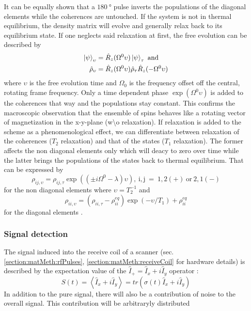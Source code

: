             It can be equally shown that a $\SI{180}{\degree}$ pulse inverts the populations of the diagonal elements while the coherences are untouched.  If the system is not in thermal equilibrium, the density matrix will evolve and generally relax back to its equilibrium state. If one neglects said relaxation at first, the free evolution can be described by 
            \begin{equation}
                \begin{split}
                    \ket\psi_\upsilon &= \hat R_z(\Omega^0\upsilon)\ket\psi_\tau ~ \mathrm{and} \\
                    \hat\rho_\upsilon &= \hat R_z(\Omega^0\upsilon)\hat\rho_\tau\hat R_z(-\Omega^0\upsilon)
                \end{split}
            \end{equation}
            where $\upsilon$ is the free evolution time and $\Omega_0$ is the frequency offset off the central, rotating frame frequency. Only a time dependent phase $\exp{(\Omega^0 \upsilon)}$ is added to the coherences that way and the populations stay constant. This confirms the macroscopic observation that the ensemble of spins behaves like a rotating vector of magnetization in the x-y-plane (w\textbackslash o relaxation). If relaxation is added to the scheme as a phenomenological effect, we can differentiate between relaxation of the coherences ($T_2$ relaxation) and that of the states ($T_1$ relaxation). The former affects the non diagonal elements only which will deacy to zero over time while the latter brings the populations of the states back to thermal equilibrium. That can be expressed by
            \begin{equation}
                \rho_{ij, \upsilon} = \rho_{ij, \tau} \exp{((\pm i\Omega^0-\lambda)\upsilon)},~\mathrm{i,j~=~ 1,2(+)~or~2,1(-)}
            \end{equation}
            for the non diagonal elements where $\upsilon = T_2^{-1}$ and
            \begin{equation}
                \rho_{ii,\upsilon} = (\rho_{ii,\tau} - \rho_{ii}^{eq})\exp(-\upsilon/T_1)+\rho_{ii}^{eq}
            \end{equation}
            for the diagonal elements \cite{levitt_spin_nodate}.
        \subsubsection{Signal detection}
        The signal induced into the receive coil of a scanner (sec. \ref{section:matMeth:rfPulses}, \ref{section:matMeth:receiveCoil} for hardware details) is described by the expectation value of the $\hat{I}_+ = \hat{I}_x + i\hat{I}_y$ operator \cite{levitt_spin_nodate}:
        \begin{equation}
            S(t) = \left< \hat{I}_x + i\hat{I}_y \right> = tr\left(\sigma(t)\hat{I}_x + i\hat{I}_y\right)
        \end{equation}
        In addition to the pure signal, there will also be a contribution of noise to the overall signal. This contribution will be arbitraryly distributed 

